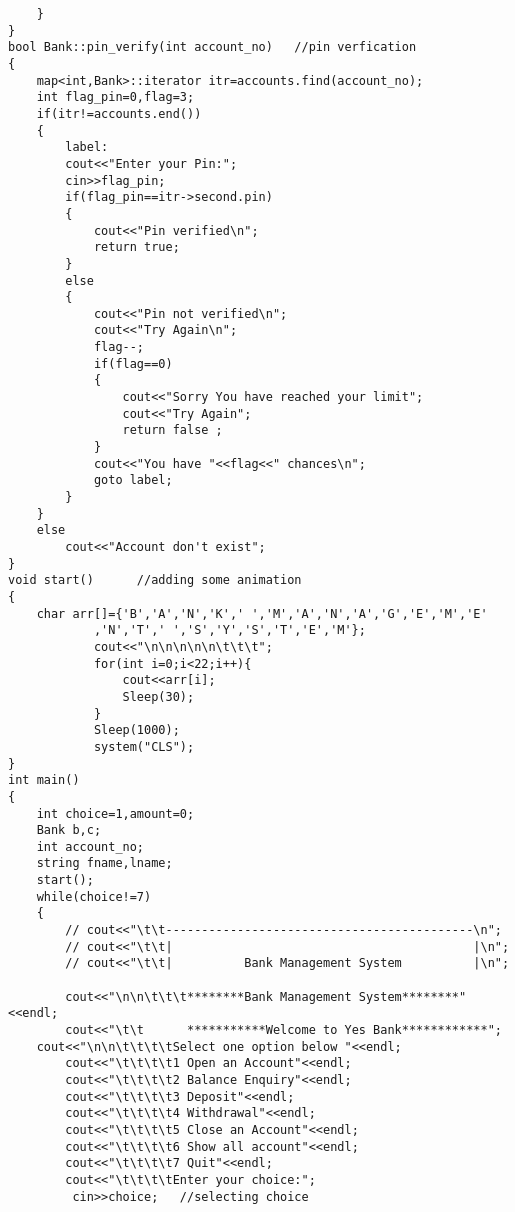 \documentclass[11pt, a4paper]{article}
\begin{document}
\begin{lstlisting}
    }
}
bool Bank::pin_verify(int account_no)   //pin verfication
{
    map<int,Bank>::iterator itr=accounts.find(account_no);
    int flag_pin=0,flag=3;
    if(itr!=accounts.end())
    {
        label:
        cout<<"Enter your Pin:";
        cin>>flag_pin;
        if(flag_pin==itr->second.pin)
        {
            cout<<"Pin verified\n";
            return true;
        }
        else
        {
            cout<<"Pin not verified\n";
            cout<<"Try Again\n";
            flag--;
            if(flag==0)
            {
                cout<<"Sorry You have reached your limit";
                cout<<"Try Again";
                return false ;
            }
            cout<<"You have "<<flag<<" chances\n";
            goto label;
        }
    }
    else
        cout<<"Account don't exist";
}
void start()      //adding some animation
{
    char arr[]={'B','A','N','K',' ','M','A','N','A','G','E','M','E'
			,'N','T',' ','S','Y','S','T','E','M'};
			cout<<"\n\n\n\n\n\t\t\t";
			for(int i=0;i<22;i++){
				cout<<arr[i];
				Sleep(30);
			}
			Sleep(1000);
			system("CLS");
}
int main()
{
    int choice=1,amount=0;
    Bank b,c;
    int account_no;
    string fname,lname;
    start();
    while(choice!=7)
    {
        // cout<<"\t\t-------------------------------------------\n";
        // cout<<"\t\t|                                          |\n";                                            
        // cout<<"\t\t|          Bank Management System          |\n";  
                
        cout<<"\n\n\t\t\t********Bank Management System********"<<endl;
        cout<<"\t\t      ***********Welcome to Yes Bank************";
    cout<<"\n\n\t\t\t\tSelect one option below "<<endl;
        cout<<"\t\t\t\t1 Open an Account"<<endl;
        cout<<"\t\t\t\t2 Balance Enquiry"<<endl;
        cout<<"\t\t\t\t3 Deposit"<<endl;
        cout<<"\t\t\t\t4 Withdrawal"<<endl;
        cout<<"\t\t\t\t5 Close an Account"<<endl;
        cout<<"\t\t\t\t6 Show all account"<<endl;
        cout<<"\t\t\t\t7 Quit"<<endl;
        cout<<"\t\t\t\tEnter your choice:";
         cin>>choice;   //selecting choice
       

\end{lstlisting}
\end{document}
